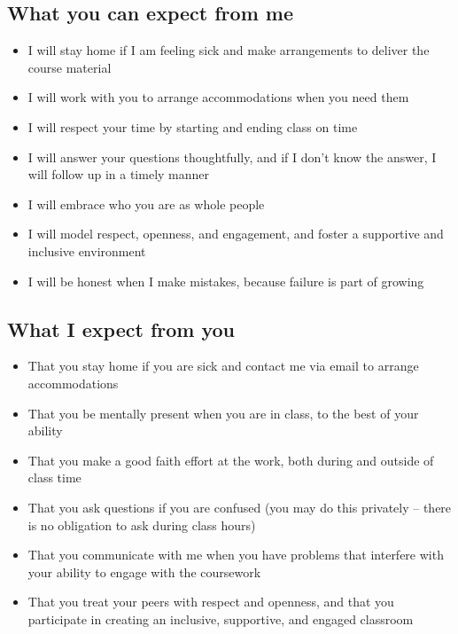 \documentclass[
  letterpaper,
  DIV=11,
  numbers=noendperiod]{scrartcl}
\providecommand{\tightlist}{%
  \setlength{\itemsep}{0pt}\setlength{\parskip}{0pt}}
\begin{document}
\subsection{What you can expect from me}

\begin{itemize}
\tightlist
\item
  I will stay home if I am feeling sick and make arrangements to deliver
  the course material
\item
  I will work with you to arrange accommodations when you need them
\item
  I will respect your time by starting and ending class on time
\item
  I will answer your questions thoughtfully, and if I don't know the
  answer, I will follow up in a timely manner
\item
  I will embrace who you are as whole people
\item
  I will model respect, openness, and engagement, and foster a
  supportive and inclusive environment
\item
  I will be honest when I make mistakes, because failure is part of
  growing
\end{itemize}

\subsection{What I expect from you}

\begin{itemize}
\tightlist
\item
  That you stay home if you are sick and contact me via email to arrange
  accommodations
\item
  That you be mentally present when you are in class, to the best of
  your ability
\item
  That you make a good faith effort at the work, both during and outside
  of class time
\item
  That you ask questions if you are confused (you may do this privately
  -- there is no obligation to ask during class hours)
\item
  That you communicate with me when you have problems that interfere
  with your ability to engage with the coursework
\item
  That you treat your peers with respect and openness, and that you
  participate in creating an inclusive, supportive, and engaged
  classroom
\end{itemize}
\end{document}
